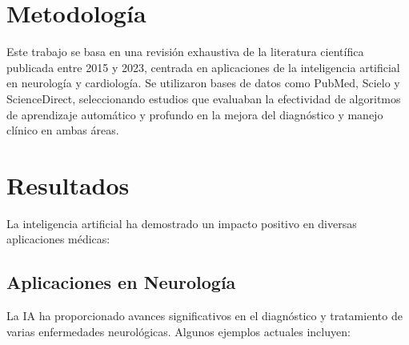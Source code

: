 \documentclass{article}
\begin{document}
\section{Metodología}
Este trabajo se basa en una revisión exhaustiva de la literatura científica publicada entre 2015 y 2023, centrada en aplicaciones de la inteligencia artificial en neurología y cardiología. Se utilizaron bases de datos como PubMed, Scielo y ScienceDirect, seleccionando estudios que evaluaban la efectividad de algoritmos de aprendizaje automático y profundo en la mejora del diagnóstico y manejo clínico en ambas áreas.


\section{Resultados}
La inteligencia artificial ha demostrado un impacto positivo en diversas aplicaciones médicas:

\subsection{Aplicaciones en Neurología}
La IA ha proporcionado avances significativos en el diagnóstico y tratamiento de varias enfermedades neurológicas. Algunos ejemplos actuales incluyen:
\end{document}
